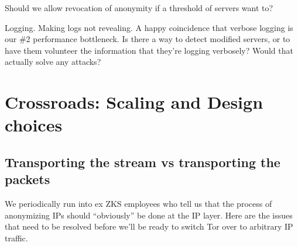 \documentclass{llncs}
\begin{document}
Should we allow revocation of anonymity if a threshold of
servers want to?

Logging. Making logs not revealing. A happy coincidence that verbose
logging is our \#2 performance bottleneck. Is there a way to detect
modified servers, or to have them volunteer the information that they're
logging verbosely? Would that actually solve any attacks?

\section{Crossroads: Scaling and Design choices}
\label{sec:crossroads-design}

\subsection{Transporting the stream vs transporting the packets}

We periodically run into ex ZKS employees who tell us that the process of
anonymizing IPs should ``obviously'' be done at the IP layer. Here are
the issues that need to be resolved before we'll be ready to switch Tor
over to arbitrary IP traffic.
\end{document}
